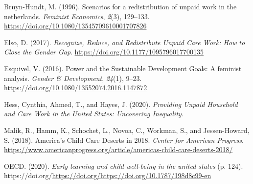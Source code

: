 \documentclass[
  11pt,
]{article}
\newlength{\cslhangindent}
\newenvironment{CSLReferences}[2] %
 {\begin{list}{}{%
  \setlength{\itemindent}{0pt}
  \setlength{\leftmargin}{0pt}
  \setlength{\parsep}{0pt}
  \ifodd #1
   \setlength{\leftmargin}{\cslhangindent}
   \setlength{\itemindent}{-1\cslhangindent}
  \fi
  \setlength{\itemsep}{#2\baselineskip}}}
 {\end{list}}
\begin{document}
\label{refs}
\begin{CSLReferences}{1}{0}
Bruyn-Hundt, M. (1996). Scenarios for a redistribution of unpaid work in
the netherlands. \emph{Feminist Economics}, \emph{2}(3), 129--133.
\url{https://doi.org/10.1080/13545709610001707826}

Elso, D. (2017). \emph{Recognize, {Reduce}, and {Redistribute} {Unpaid}
{Care} {Work}: {How} to {Close} the {Gender} {Gap}}.
\url{https://doi.org/10.1177/1095796017700135}

Esquivel, V. (2016). Power and the {Sustainable} {Development} {Goals}:
A feminist analysis. \emph{Gender \& Development}, \emph{24}(1), 9--23.
\url{https://doi.org/10.1080/13552074.2016.1147872}

Hess, Cynthia, Ahmed, T., and Hayes, J. (2020). \emph{Providing {Unpaid}
{Household} and {Care} {Work} in the {United} {States}: {Uncovering}
{Inequality}}.

Malik, R., Hamm, K., Schochet, L., Novoa, C., Workman, S., and
Jessen-Howard, S. (2018). America's {Child} {Care} {Deserts} in 2018.
\emph{Center for American Progress}.
\url{https://www.americanprogress.org/article/americas-child-care-deserts-2018/}

OECD. (2020). \emph{Early learning and child well-being in the united
states} (p. 124).
https://doi.org/\url{https://doi.org/https://doi.org/10.1787/198d8c99-en}

\end{CSLReferences}
\end{document}
